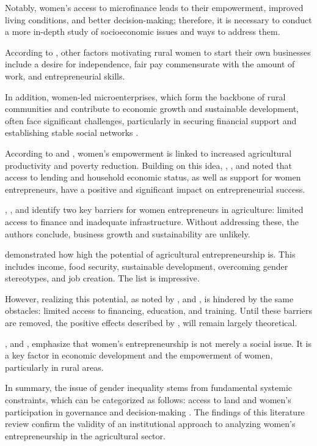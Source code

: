 ﻿\documentclass[pdflatex,sn-mathphys-ay]{sn-jnl}
\begin{document}
Notably, women's access to microfinance
\citep{ref60} leads to their empowerment, improved
living conditions, and better decision-making; therefore, it is
necessary to conduct a more in-depth study of socioeconomic issues and
ways to address them.

According to \citet{ref91}, other factors
motivating rural women to start their own businesses include a desire
for independence, fair pay commensurate with the amount of work, and
entrepreneurial skills.

In addition, women-led microenterprises, which form the backbone of
rural communities and contribute to economic growth and sustainable
development, often face significant challenges, particularly in securing
financial support and establishing stable social networks \citep{ref14}.

According to \citet{ref68} and \citet{ref46},
women's empowerment is linked to increased agricultural productivity and
poverty reduction. Building on this idea, \citet{ref94},
\citet{ref88}, and \citet{ref16} noted that
access to lending and household economic status, as well as support for
women entrepreneurs, have a positive and significant impact on
entrepreneurial success.

\citet{ref35}, \citet{ref23}, and \citet{ref62} identify two key barriers for women entrepreneurs in
agriculture: limited access to finance and inadequate infrastructure.
Without addressing these, the authors conclude, business growth and
sustainability are unlikely.

\citet{ref99} demonstrated how high the potential of
agricultural entrepreneurship is. This includes income, food security,
sustainable development, overcoming gender stereotypes, and job
creation. The list is impressive.

However, realizing this potential, as noted by \citet{ref25},
and \citet{ref85}, is hindered by the same obstacles:
limited access to financing, education, and training. Until these
barriers are removed, the positive effects described by \citet{ref99}, will remain largely theoretical.

\citet{ref89}, and \citet{ref19},
emphasize that women's entrepreneurship is not merely a social issue. It
is a key factor in economic development and the empowerment of women,
particularly in rural areas.

In summary, the issue of gender inequality stems
from fundamental systemic constraints, which can be categorized as
follows: access to land \citep{ref39,ref06,ref102,ref52,ref12} and women's participation in governance and decision-making
\citep{ref79,ref40,ref08,ref09,ref69}. The findings of this literature review
confirm the validity of an institutional approach to analyzing women's
entrepreneurship in the agricultural sector.
\end{document}

